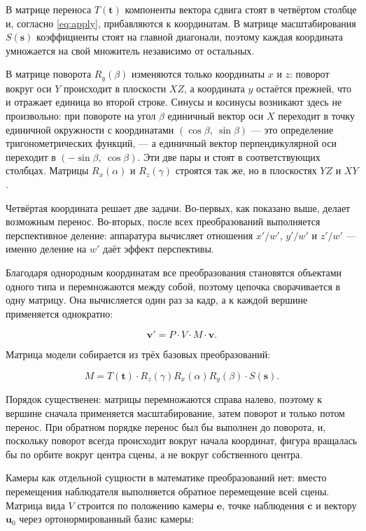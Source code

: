 \documentclass[14pt,a4paper]{extarticle}
\begin{document}
В матрице переноса $T(\mathbf{t})$ компоненты вектора сдвига стоят в четвёртом
столбце и, согласно \eqref{eq:apply}, прибавляются к координатам. В матрице
масштабирования $S(\mathbf{s})$ коэффициенты стоят на главной диагонали,
поэтому каждая координата умножается на свой множитель независимо от
остальных.

В матрице поворота $R_y(\beta)$ изменяются только координаты $x$ и $z$:
поворот вокруг оси $Y$ происходит в плоскости $XZ$, а координата $y$ остаётся
прежней, что и отражает единица во второй строке. Синусы и косинусы возникают
здесь не произвольно: при повороте на угол $\beta$ единичный вектор оси $X$
переходит в точку единичной окружности с координатами $(\cos\beta,\ \sin\beta)$
— это определение тригонометрических функций, — а единичный вектор
перпендикулярной оси переходит в $(-\sin\beta,\ \cos\beta)$. Эти две пары и
стоят в соответствующих столбцах. Матрицы $R_x(\alpha)$ и $R_z(\gamma)$
строятся так же, но в плоскостях $YZ$ и $XY$.

Четвёртая координата решает две задачи. Во-первых, как показано выше, делает
возможным перенос. Во-вторых, после всех преобразований выполняется
перспективное деление: аппаратура вычисляет отношения $x'/w'$, $y'/w'$ и $z'/w'$ —
именно деление на $w'$ даёт эффект перспективы.

Благодаря однородным координатам все преобразования становятся объектами
одного типа и перемножаются между собой, поэтому цепочка сворачивается в одну
матрицу. Она вычисляется один раз за кадр, а к каждой вершине применяется
однократно:

\begin{equation}
	\mathbf{v}' = P \cdot V \cdot M \cdot \mathbf{v}.
	\label{eq:mvp}
\end{equation}

Матрица модели собирается из трёх базовых преобразований:

\begin{equation}
	M = T(\mathbf{t}) \cdot R_z(\gamma) R_x(\alpha) R_y(\beta) \cdot S(\mathbf{s}).
	\label{eq:model}
\end{equation}

Порядок существенен: матрицы перемножаются справа налево, поэтому к вершине
сначала применяется масштабирование, затем поворот и только потом перенос. При
обратном порядке перенос был бы выполнен до поворота, и, поскольку поворот
всегда происходит вокруг начала координат, фигура вращалась бы по орбите вокруг
центра сцены, а не вокруг собственного центра.

Камеры как отдельной сущности в математике преобразований нет: вместо
перемещения наблюдателя выполняется обратное перемещение всей сцены. Матрица
вида $V$ строится по положению камеры $\mathbf{e}$, точке наблюдения
$\mathbf{c}$ и вектору $\mathbf{u}_0$ через ортонормированный базис камеры:
\end{document}
